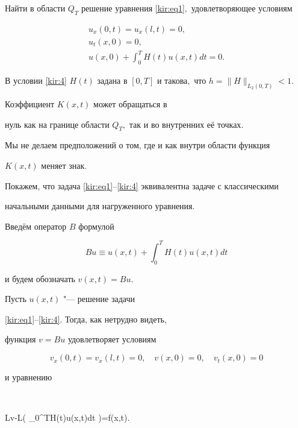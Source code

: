 \begin{task}[1]Найти в области $Q_T$ решение уравнения \eqref{kir:eq1}$,$ удовлетворяющее условиям

\begin{gather}

\label{kir:2} u_x(0,t)=u_x(l,t)=0,\\

\label{kir:4} u_t(x, 0)=0,\\

\label{kir:4} u(x, 0)+ \int _0^T H(t)u(x,t)dt=0.

\end{gather}

В условии \eqref{kir:4} $H(t)$ задана в $[0, T]$ и такова$,$ что $h=\|H\|_{L_2(0, T)}<1.$ 

Коэффициент $K(x,t)$ может обращаться в

нуль как на границе области $Q_T,$ так и во внутренних её точках$.$

Мы не делаем предположений о том, где и как внутри области функция

$K(x,t)$ меняет знак$.$

\end{task}



\smallskip



 Покажем, что задача \eqref{kir:eq1}--\eqref{kir:4} эквивалентна задаче с классическими

начальными данными для нагруженного уравнения.



Введём оператор $B$ формулой

$$

Bu\equiv u(x,t)+ \int _0^TH(t)u(x,t)dt

$$

и будем обозначать $v(x,t)=Bu$.



Пусть $u(x,t)$ "--- решение задачи

\eqref{kir:eq1}--\eqref{kir:4}. Тогда, как нетрудно видеть,

функция $v=Bu$ удовлетворяет условиям

$$

v_x(0,t)=v_x(l,t)=0, \quad v(x, 0)=0, \quad  v_t(x, 0)=0

$$

и уравнению

$$

Lv-L\biggl( \int _0^TH(t)u(x,t)dt \biggr)=f(x,t).


